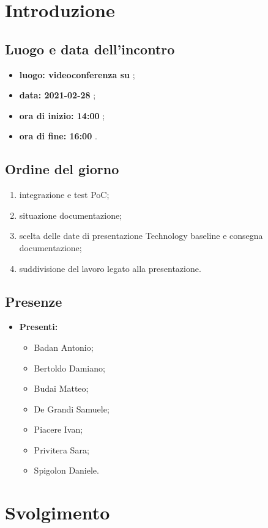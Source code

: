 \section*{Introduzione}
\subsection*{Luogo e data dell'incontro}
\begin{itemize}
	\item \textbf{luogo: videoconferenza su } ;
	\item \textbf{data: 2021-02-28} ;
	\item \textbf{ora di inizio: 14:00} ;
	\item \textbf{ora di fine: 16:00} .
\end{itemize}

\subsection*{Ordine del giorno}
\begin{enumerate}
	\item integrazione e test PoC;
	\item situazione documentazione;
	\item scelta delle date di presentazione Technology baseline e consegna documentazione;
	\item suddivisione del lavoro legato alla presentazione.
\end{enumerate}

\subsection*{Presenze}
\begin{itemize}
	\item \textbf{Presenti:}
	\begin{itemize}
		\item Badan Antonio;
		\item Bertoldo Damiano;
		\item Budai Matteo;
		\item De Grandi Samuele;
		\item Piacere Ivan;
		\item Privitera Sara;
		\item Spigolon Daniele.
	\end{itemize}
\end{itemize}

\section*{Svolgimento}
